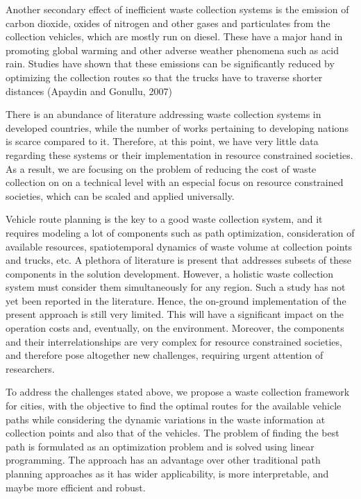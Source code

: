 \documentclass[12pt]{article}
\begin{document}
Another secondary effect of inefficient waste collection systems is the emission of carbon dioxide, oxides of nitrogen and other gases and particulates from the collection vehicles, which are mostly run on diesel. These have a major hand in promoting global warming and other adverse weather phenomena such as acid rain. Studies have shown that these emissions can be significantly reduced by optimizing the collection routes so that the trucks have to traverse shorter distances (Apaydin and Gonullu, 2007) 

There is an abundance of literature addressing waste collection systems in developed countries, while the number of works pertaining to developing nations is scarce compared to it. Therefore, at this point, we have very little data regarding these systems or their implementation in resource constrained societies. As a result, we are focusing on the problem of reducing the cost of waste collection on on a technical level with an especial focus on resource constrained societies, which can be scaled and applied universally.

Vehicle route planning is the key to a good waste collection system, and it requires modeling a lot of components such as path optimization, consideration of available resources, spatiotemporal dynamics of waste volume at collection points and trucks, etc. A plethora of literature is present that addresses subsets of these components in the solution development. However, a holistic waste collection system must consider them simultaneously for any region. Such a study has not yet been reported in the literature. Hence, the on-ground implementation of the present approach is still very limited. This will have a significant impact on the operation costs and, eventually, on the environment. Moreover, the components and their interrelationships are very complex for resource constrained societies, and therefore pose altogether new challenges, requiring urgent attention of researchers.

To address the challenges stated above, we propose a waste collection framework for cities, with the objective to find the optimal routes for the available vehicle paths while considering the dynamic variations in the waste information at collection points and also that of the vehicles. The problem of finding the best path is formulated as an optimization problem and is solved using linear programming. The approach has an advantage over other traditional path planning approaches as it has wider applicability, is more interpretable, and maybe more efficient and robust.
\end{document}
